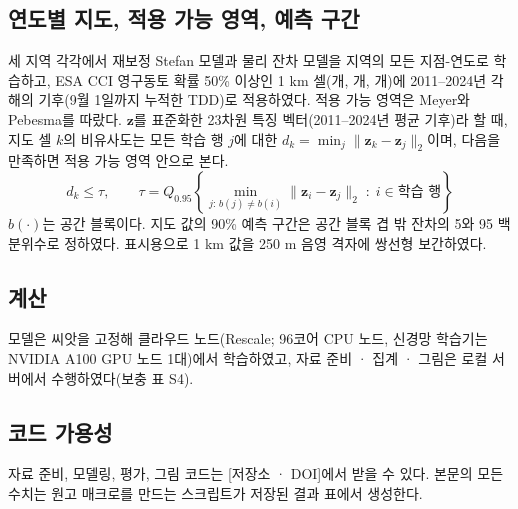 \subsection{연도별 지도, 적용 가능 영역, 예측 구간}
세 지역 각각에서 재보정 Stefan 모델과 물리 잔차 모델을 지역의 모든 지점-연도로 학습하고, ESA CCI 영구동토 확률 50\% 이상인 1 km 셀(\nncellmapAk{}개, \nncellmapLe{}개, \nncellmapCa{}개)에 2011--2024년 각 해의 기후(9월 1일까지 누적한 TDD)로 적용하였다. 적용 가능 영역은 Meyer와 Pebesma\cite{MeyerPebesma2021}를 따랐다. $\mathbf{z}$를 표준화한 23차원 특징 벡터(2011--2024년 평균 기후)라 할 때, 지도 셀 $k$의 비유사도는 모든 학습 행 $j$에 대한 $d_k = \min_{j} \lVert \mathbf{z}_k - \mathbf{z}_j \rVert_2$이며, 다음을 만족하면 적용 가능 영역 안으로 본다.
\begin{equation}
d_k \leq \tau, \qquad \tau = Q_{0.95}\!\left\{ \min_{j:\, b(j) \neq b(i)} \lVert \mathbf{z}_i - \mathbf{z}_j \rVert_2 \;:\; i \in \text{학습 행} \right\}
\label{eq:aoa}
\end{equation}
$b(\cdot)$는 공간 블록이다. 지도 값의 90\% 예측 구간은 공간 블록 겹 밖 잔차의 5와 95 백분위수로 정하였다. 표시용으로 1 km 값을 250 m 음영 격자에 쌍선형 보간하였다.

\subsection{계산}
모델은 씨앗을 고정해 클라우드 노드(Rescale; 96코어 CPU 노드, 신경망 학습기는 NVIDIA A100 GPU 노드 1대)에서 학습하였고, 자료 준비 · 집계 · 그림은 로컬 서버에서 수행하였다(보충 표 S4).

\subsection{코드 가용성}
자료 준비, 모델링, 평가, 그림 코드는 [저장소 · DOI]에서 받을 수 있다. 본문의 모든 수치는 원고 매크로를 만드는 스크립트가 저장된 결과 표에서 생성한다.
